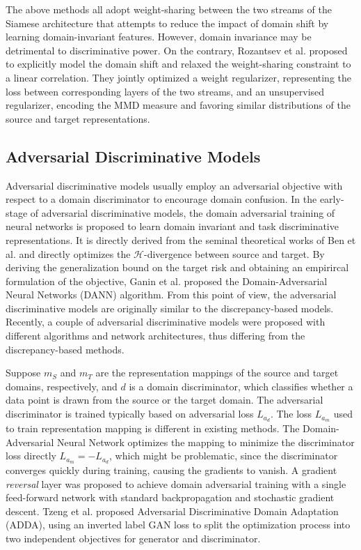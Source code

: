 \documentclass[conference]{IEEEtran}
\begin{document}
The above methods all adopt weight-sharing between the two streams of 
the Siamese architecture that attempts to reduce the impact of domain shift
by learning domain-invariant features.
However, domain invariance may be detrimental to discriminative power.
On the contrary, Rozantsev et al. proposed to explicitly model the domain
shift and relaxed the weight-sharing constraint to a linear correlation.
They jointly optimized a weight regularizer, representing the loss between
corresponding layers of the two streams, and an unsupervised regularizer, encoding
the MMD measure and favoring similar distributions of the source and target representations.

\subsection{Adversarial Discriminative Models}
Adversarial discriminative models usually employ an adversarial objective
with respect to a domain discriminator to encourage domain confusion. 
In the early-stage of adversarial discriminative models, the domain adversarial 
training of neural networks is proposed to learn domain invariant and task discriminative representations.
It is directly derived from the seminal theoretical works of Ben et al.
and directly optimizes the $\mathcal{H}$-divergence between source and target.
By deriving the generalization bound on the target risk and obtaining 
an empirircal formulation of the objective, Ganin et al. proposed the Domain-Adversarial
Neural Networks (DANN) algorithm. 
From this point of view, the adversarial discriminative models are originally
similar to the discrepancy-based models. 
Recently, a couple of adversarial discriminative models were proposed with different 
algorithms and network architectures, thus differing from the discrepancy-based methods.

Suppose $m_S$ and $m_T$ are the representation mappings of the source and target domains, 
respectively, and $d$ is a domain discriminator, which classifies whether
a data point is drawn from the source or the target domain. 
The adversarial discriminator is trained typically based on adversarial loss $L_{a_d}$.
The loss $L_{a_m}$ used to train representation mapping is different in existing methods.
The Domain-Adversarial Neural Network optimizes the mapping to minimize 
the discriminator loss directly $L_{a_m} = -L_{a_d}$, which might be problematic,
since the discriminator converges quickly during training, causing the gradients
to vanish. 
A gradient \textit{reversal} layer was proposed to achieve domain adversarial training 
with a single feed-forward network with standard backpropagation and stochastic gradient
descent. 
Tzeng et al. proposed Adversarial Discriminative Domain Adaptation (ADDA),
using an inverted label GAN loss to split the optimization process into two 
independent objectives for generator and discriminator.
\end{document}
